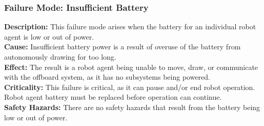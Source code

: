 \subsubsection{Failure Mode: Insufficient Battery}
\label{sec:power_fm_battery}
\textbf{Description:} This failure mode arises when the battery for an individual robot agent is low or out of power.\\
\textbf{Cause:} Insufficient battery power is a result of overuse of the battery from autonomously drawing for too long.\\
\textbf{Effect:} The result is a robot agent being unable to move, draw, or communicate with the offboard system, as it has no subsystems being powered.\\
\textbf{Criticality:} This failure is critical, as it can pause and/or end robot operation. Robot agent battery must be replaced before operation can continue.\\
\textbf{Safety Hazards:} There are no safety hazards that result from the battery being low or out of power.